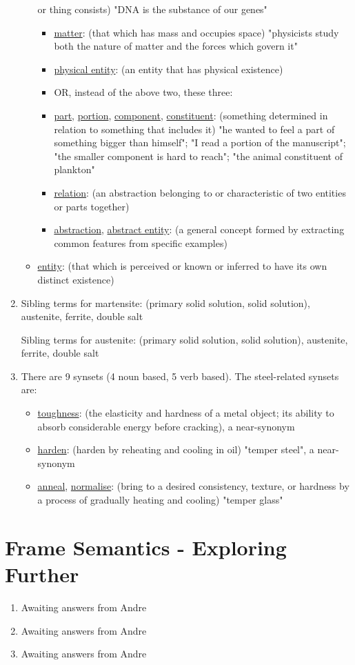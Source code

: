 \documentclass[12pt]{report}
\begin{document}
\begin{enumerate}
\begin{itemize}
    or thing consists)
    "DNA is the substance of our genes"
    \begin{itemize}
      \item \underline{matter}: (that which has mass and occupies space)
      "physicists study both the nature of matter and the forces which govern
      it"
      \item \underline{physical entity}: (an entity that has physical
      existence)
      \item OR, instead of the above two, these three:
      \item \underline{part}, \underline{portion}, \underline{component},
      \underline{constituent}: (something determined in relation to something
      that includes it)
      "he wanted to feel a part of something bigger than himself"; "I read a
      portion of the manuscript"; "the smaller component is hard to reach";
      "the animal constituent of plankton"
      \item \underline{relation}: (an abstraction belonging to or
      characteristic of two entities or parts together)
      \item \underline{abstraction}, \underline{abstract entity}: (a general
      concept formed by extracting common features from specific examples)
    \end{itemize}
    \item \underline{entity}: (that which is perceived or known or inferred
    to have its own distinct existence)
  \end{itemize}
  \item Sibling terms for martensite: (primary solid solution, solid solution),
  austenite, ferrite, double salt\par
  Sibling terms for austenite: (primary solid solution, solid solution),
  austenite, ferrite, double salt
  \item There are 9 synsets (4 noun based, 5 verb based). The steel-related
  synsets are:
  \begin{itemize}
    \item \underline{toughness}: (the elasticity and hardness of a metal
    object; its ability to absorb considerable energy before cracking), a
    near-synonym
    \item \underline{harden}: (harden by reheating and cooling in oil)
    "temper steel", a near-synonym
    \item \underline{anneal}, \underline{normalise}: (bring to a desired
    consistency, texture, or hardness by a process of gradually heating and
    cooling) "temper glass"
  \end{itemize}
\end{enumerate}

\section{Frame Semantics - Exploring Further}
\begin{enumerate}
  \item Awaiting answers from Andre
  \item Awaiting answers from Andre
  \item Awaiting answers from Andre
\end{enumerate}
\end{document}
